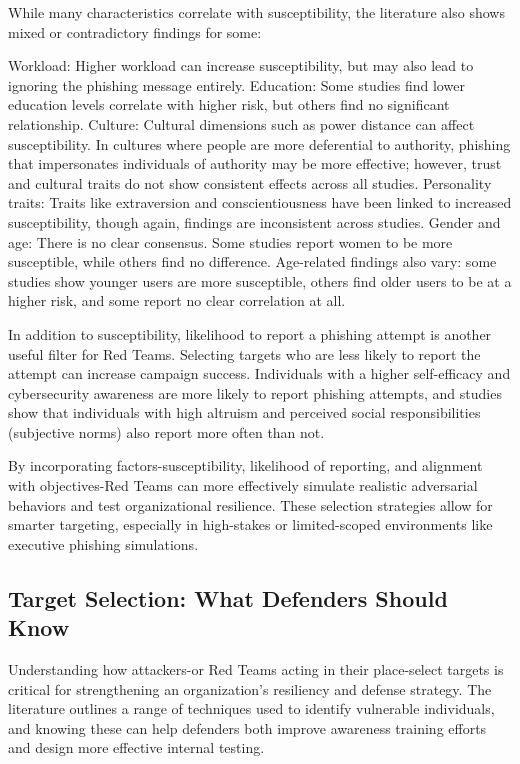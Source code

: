 While many characteristics correlate with susceptibility, the literature also shows mixed or contradictory findings for some:

Workload: Higher workload can increase susceptibility, but may also lead to ignoring the phishing message entirely.
Education: Some studies find lower education levels correlate with higher risk, but others find no significant relationship.
Culture: Cultural dimensions such as power distance can affect susceptibility. In cultures where people are more deferential to authority, phishing that impersonates individuals of authority may be more effective; however, trust and cultural traits do not show consistent effects across all studies.
Personality traits: Traits like extraversion and conscientiousness have been linked to increased susceptibility, though again, findings are inconsistent across studies.
Gender and age: There is no clear consensus. Some studies report women to be more susceptible, while others find no difference. Age-related findings also vary: some studies show younger users are more susceptible, others find older users to be at a higher risk, and some report no clear correlation at all.

In addition to susceptibility, likelihood to report a phishing attempt is another useful filter for Red Teams. Selecting targets who are less likely to report the attempt can increase campaign success. Individuals with a higher self-efficacy and cybersecurity awareness are more likely to report phishing attempts, and studies show that individuals with high altruism and perceived social responsibilities (subjective norms) also report more often than not.

By incorporating factors-susceptibility, likelihood of reporting, and alignment with objectives-Red Teams can more effectively simulate realistic adversarial behaviors and test organizational resilience. These selection strategies allow for smarter targeting, especially in high-stakes or limited-scoped environments like executive phishing simulations.

\subsection{Target Selection: What Defenders Should Know}
Understanding how attackers-or Red Teams acting in their place-select targets is critical for strengthening an organization's resiliency and defense strategy. The literature outlines a range of techniques used to identify vulnerable individuals, and knowing these can help defenders both improve awareness training efforts and design more effective internal testing.

